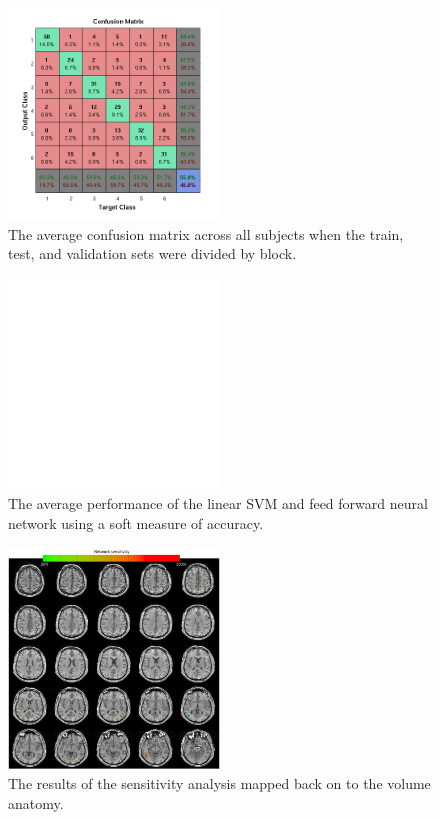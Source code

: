 \documentclass[final]{article}
\begin{document}
\begin{figure}[!htbp]
\centering
\includegraphics[width=0.5\textwidth]{figures/confusion-average}
\caption{The average confusion matrix across all subjects when the train, test, and validation sets were divided by block.}
\label{fig:average-confusion}
\end{figure}

\begin{figure}[!htbp]
\centering
\includegraphics[width=0.5\textwidth]{figures/placeholder}
\caption{The average performance of the linear SVM and feed forward neural network using a soft measure of accuracy.}
\label{fig:soft-measure}
\end{figure}

\begin{figure}[!htbp]
\centering
\includegraphics[width=0.5\textwidth]{figures/sensitivity-analysis}
\caption{The results of the sensitivity analysis mapped back on to the volume anatomy.}
\label{fig:sensitivity-analysis}
\end{figure}
\end{document}
